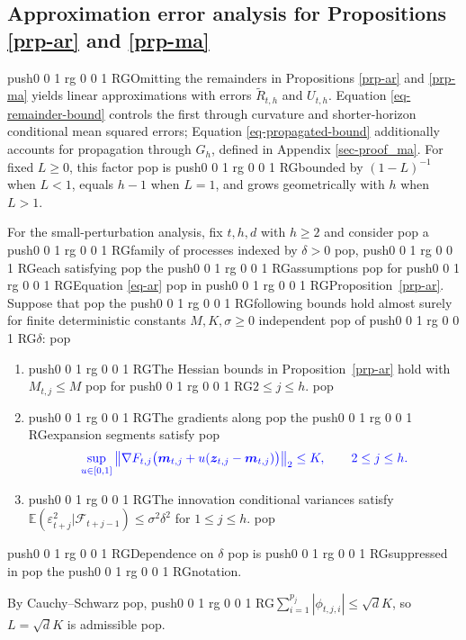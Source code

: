 \documentclass[
  american,
  12pt]{article}
\providecommand{\tightlist}{%
  \setlength{\itemsep}{0pt}\setlength{\parskip}{0pt}}
\theoremstyle{plain}
\theoremstyle{plain}
\theoremstyle{remark}
\newcommand{\CPTSadd}[1]{\ifmmode\else\leavevmode\fi\pdfcolorstack 0 push{0 0 1 rg 0 0 1 RG}#1\pdfcolorstack 0 pop}
\begin{document}
\subsection{\texorpdfstring{Approximation error analysis for
Propositions \ref{prp-ar} and
\ref{prp-ma}}{Approximation error analysis for Propositions  and }}\label{sec-approximation-errors}

\CPTSadd{Omitting the remainders in Propositions \ref{prp-ar} and \ref{prp-ma}
yields linear approximations with errors \(\widetilde R_{t,h}\) and
\(U_{t,h}\). Equation \eqref{eq-remainder-bound} controls the first
through curvature and shorter-horizon conditional mean squared errors;
Equation \eqref{eq-propagated-bound} additionally accounts for
propagation through \(G_h\), defined in Appendix \ref{sec-proof_ma}. For
fixed \(L\geq0\), this factor} is \CPTSadd{bounded by \((1-L)^{-1}\) when \(L<1\),
equals \(h-1\) when \(L=1\), and grows geometrically with \(h\) when
\(L>1\).

For the small-perturbation analysis, fix \(t,h,d\) with \(h\geq2\) and
consider} a \CPTSadd{family of processes indexed by \(\delta>0\)}, \CPTSadd{each satisfying}
the \CPTSadd{assumptions} for \CPTSadd{Equation \eqref{eq-ar}} in \CPTSadd{Proposition~\ref{prp-ar}.
Suppose that} the \CPTSadd{following bounds hold almost surely for finite
deterministic constants \(M,K,\sigma\geq0\) independent} of \CPTSadd{\(\delta\):}

\begin{enumerate}
\def\labelenumi{\arabic{enumi}.}
\tightlist
\item
  \CPTSadd{The Hessian bounds in Proposition~\ref{prp-ar} hold with
  \(M_{t,j}\leq M\)} for \CPTSadd{\(2\leq j\leq h\).}
\item
  \CPTSadd{The gradients along} the \CPTSadd{expansion segments satisfy} \[
  \CPTSadd{\sup_{u\in[0,1]}\left\|\nabla F_{t,j}\bigl(\bm m_{t,j}+u(\bm z_{t,j}-\bm m_{t,j})\bigr)\right\|_2\leq K,
  \qquad 2\leq j\leq h.}
  \]
\item
  \CPTSadd{The innovation conditional variances satisfy
  \(\mathbb E(\varepsilon_{t+j}^2|\mathcal F_{t+j-1})\leq\sigma^2\delta^2\)
  for \(1\leq j\leq h\).}
\end{enumerate}

\noindent \CPTSadd{Dependence on \(\delta\)} is \CPTSadd{suppressed in} the \CPTSadd{notation.

By Cauchy--Schwarz}, \CPTSadd{\(\sum_{i=1}^{p_j}|\phi_{t,j,i}|\leq\sqrt d K\), so
\(L=\sqrt d K\) is admissible}.
\end{document}
